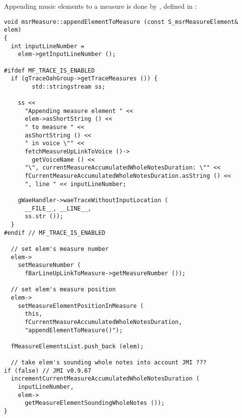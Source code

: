 Appending music elements to a measure is done by , defined in :%
\begin{lstlisting}[language=CPlusPlus]
void msrMeasure::appendElementToMeasure (const S_msrMeasureElement& elem)
{
  int inputLineNumber =
    elem->getInputLineNumber ();

#ifdef MF_TRACE_IS_ENABLED
  if (gTraceOahGroup->getTraceMeasures ()) {
		std::stringstream ss;

    ss <<
      "Appending measure element " <<
      elem->asShortString () <<
      " to measure " <<
      asShortString () <<
      " in voice \"" <<
      fetchMeasureUpLinkToVoice ()->
        getVoiceName () <<
      "\", currentMeasureAccumulatedWholeNotesDuration: \"" <<
      fCurrentMeasureAccumulatedWholeNotesDuration.asString () <<
      ", line " << inputLineNumber;

    gWaeHandler->waeTraceWithoutInputLocation (
      __FILE__, __LINE__,
      ss.str ());
  }
#endif // MF_TRACE_IS_ENABLED

  // set elem's measure number
  elem->
    setMeasureNumber (
      fBarLineUpLinkToMeasure->getMeasureNumber ());

  // set elem's measure position
  elem->
    setMeasureElementPositionInMeasure (
      this,
      fCurrentMeasureAccumulatedWholeNotesDuration,
      "appendElementToMeasure()");

  fMeasureElementsList.push_back (elem);

  // take elem's sounding whole notes into account JMI ???
if (false) // JMI v0.9.67
  incrementCurrentMeasureAccumulatedWholeNotesDuration (
    inputLineNumber,
    elem->
      getMeasureElementSoundingWholeNotes ());
}
\end{lstlisting}

